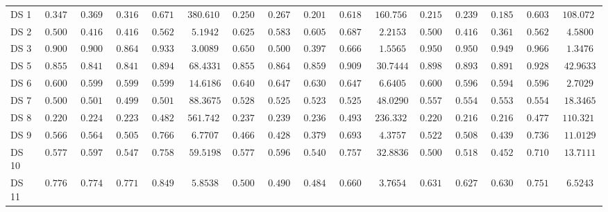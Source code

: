{\begin{longtable}{|l|ccccc|ccccc|ccccc|}
		DS 1 & $\boldsymbol{0.3472}$ & $\boldsymbol{0.3698}$ & $\boldsymbol{0.3168}$ & $\boldsymbol{0.6718}$ & $380.6107$ & $0.2500$ & $0.2674$ & $0.2018$ & $0.6184$ & $160.7560$ & $0.2153$ & $0.2391$ & $0.1855$ & $0.6037$ & $108.0720$ \\
		DS 2 & $0.5000$ & $0.4167$ & $0.4167$ & $0.5625$ & $5.1942$ & $\boldsymbol{0.6250}$ & $\boldsymbol{0.5833}$ & $\boldsymbol{0.6056}$ & $\boldsymbol{0.6875}$ & $2.2153$ & $0.5000$ & $0.4167$ & $0.3611$ & $0.5625$ & $4.5800$ \\
		DS 3 & $0.9000$ & $0.9000$ & $0.8648$ & $0.9333$ & $3.0089$ & $0.6500$ & $0.5000$ & $0.3971$ & $0.6667$ & $1.5565$ & $\boldsymbol{0.9500}$ & $\boldsymbol{0.9500}$ & $\boldsymbol{0.9495}$ & $\boldsymbol{0.9667}$ & $1.3476$ \\
		DS 5 & $0.8551$ & $0.8412$ & $0.8417$ & $0.8941$ & $68.4331$ & $0.8551$ & $0.8640$ & $0.8597$ & $0.9093$ & $30.7444$ & $\boldsymbol{0.8986}$ & $\boldsymbol{0.8931}$ & $\boldsymbol{0.8912}$ & $\boldsymbol{0.9288}$ & $42.9633$ \\
		DS 6 & $0.6000$ & $0.5994$ & $0.5994$ & $0.5994$ & $14.6186$ & $\boldsymbol{0.6400}$ & $\boldsymbol{0.6474}$ & $\boldsymbol{0.6305}$ & $\boldsymbol{0.6474}$ & $6.6405$ & $0.6000$ & $0.5962$ & $0.5942$ & $0.5962$ & $2.7029$ \\
		DS 7 & $0.5000$ & $0.5015$ & $0.4998$ & $0.5015$ & $88.3675$ & $0.5288$ & $0.5256$ & $0.5235$ & $0.5256$ & $48.0290$ & $\boldsymbol{0.5577}$ & $\boldsymbol{0.5548}$ & $\boldsymbol{0.5536}$ & $\boldsymbol{0.5548}$ & $18.3465$ \\
		DS 8 & $0.2203$ & $0.2244$ & $0.2237$ & $0.4829$ & $561.7420$ & $\boldsymbol{0.2373}$ & $\boldsymbol{0.2396}$ & $\boldsymbol{0.2364}$ & $\boldsymbol{0.4931}$ & $236.3328$ & $0.2203$ & $0.2164$ & $0.2162$ & $0.4776$ & $110.3218$ \\
		DS 9 & $\boldsymbol{0.5667}$ & $\boldsymbol{0.5640}$ & $\boldsymbol{0.5053}$ & $\boldsymbol{0.7664}$ & $6.7707$ & $0.4667$ & $0.4282$ & $0.3797$ & $0.6937$ & $4.3757$ & $0.5222$ & $0.5082$ & $0.4395$ & $0.7366$ & $11.0129$ \\
		DS 10 & $0.5778$ & $\boldsymbol{0.5979}$ & $\boldsymbol{0.5470}$ & $\boldsymbol{0.7588}$ & $59.5198$ & $\boldsymbol{0.5778}$ & $0.5961$ & $0.5402$ & $0.7577$ & $32.8836$ & $0.5000$ & $0.5182$ & $0.4525$ & $0.7109$ & $13.7111$ \\
		DS 11 & $\boldsymbol{0.7763}$ & $\boldsymbol{0.7746}$ & $\boldsymbol{0.7712}$ & $\boldsymbol{0.8497}$ & $5.8538$ & $0.5000$ & $0.4902$ & $0.4843$ & $0.6601$ & $3.7654$ & $0.6316$ & $0.6271$ & $0.6305$ & $0.7514$ & $6.5243$ \\

\end{longtable}}
